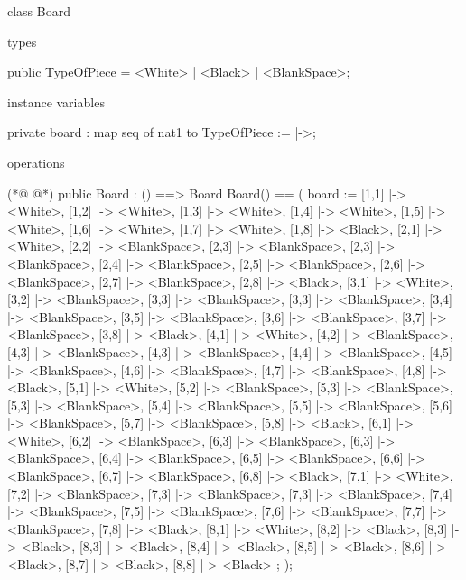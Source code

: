 \begin{vdmpp}[breaklines=true]
class Board

types
 
 public TypeOfPiece = <White> | <Black> | <BlankSpace>;
  
instance variables
 
 private board : map seq of nat1 to TypeOfPiece := {|->};

operations

(*@
\label{Board:13}
@*)
 public Board : () ==> Board
  Board() ==
  (
   board := {
     [1,1] |-> <White>, [1,2] |-> <White>, [1,3] |-> <White>, [1,4] |-> <White>, [1,5] |-> <White>, [1,6] |-> <White>, [1,7] |-> <White>, [1,8] |-> <Black>,
     [2,1] |-> <White>, [2,2] |-> <BlankSpace>, [2,3] |-> <BlankSpace>, [2,3] |-> <BlankSpace>, [2,4] |-> <BlankSpace>, [2,5] |-> <BlankSpace>, [2,6] |-> <BlankSpace>, [2,7] |-> <BlankSpace>, [2,8] |-> <Black>,
     [3,1] |-> <White>, [3,2] |-> <BlankSpace>, [3,3] |-> <BlankSpace>, [3,3] |-> <BlankSpace>, [3,4] |-> <BlankSpace>, [3,5] |-> <BlankSpace>, [3,6] |-> <BlankSpace>, [3,7] |-> <BlankSpace>, [3,8] |-> <Black>,
     [4,1] |-> <White>, [4,2] |-> <BlankSpace>, [4,3] |-> <BlankSpace>, [4,3] |-> <BlankSpace>, [4,4] |-> <BlankSpace>, [4,5] |-> <BlankSpace>, [4,6] |-> <BlankSpace>, [4,7] |-> <BlankSpace>, [4,8] |-> <Black>,
     [5,1] |-> <White>, [5,2] |-> <BlankSpace>, [5,3] |-> <BlankSpace>, [5,3] |-> <BlankSpace>, [5,4] |-> <BlankSpace>, [5,5] |-> <BlankSpace>, [5,6] |-> <BlankSpace>, [5,7] |-> <BlankSpace>, [5,8] |-> <Black>,
     [6,1] |-> <White>, [6,2] |-> <BlankSpace>, [6,3] |-> <BlankSpace>, [6,3] |-> <BlankSpace>, [6,4] |-> <BlankSpace>, [6,5] |-> <BlankSpace>, [6,6] |-> <BlankSpace>, [6,7] |-> <BlankSpace>, [6,8] |-> <Black>,
     [7,1] |-> <White>, [7,2] |-> <BlankSpace>, [7,3] |-> <BlankSpace>, [7,3] |-> <BlankSpace>, [7,4] |-> <BlankSpace>, [7,5] |-> <BlankSpace>, [7,6] |-> <BlankSpace>, [7,7] |-> <BlankSpace>, [7,8] |-> <Black>,
     [8,1] |-> <White>, [8,2] |-> <Black>, [8,3] |-> <Black>, [8,3] |-> <Black>, [8,4] |-> <Black>, [8,5] |-> <Black>, [8,6] |-> <Black>, [8,7] |-> <Black>, [8,8] |-> <Black>
   };
  );


\end{vdmpp}
